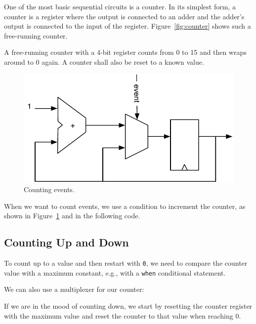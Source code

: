 \documentclass[%
    10pt,
    headinclude, footexclude,
    openright, %
    notitlepage,
    cleardoubleempty,
    headsepline,
    pointlessnumbers,
    bibtotoc, idxtotoc,
    ]{scrbook}
\newcommand{\code}[1]{{\small{\texttt{#1}}}}
\newcommand{\scale}{0.7}
\begin{document}
One of the most basic sequential circuits is a counter. In its simplest form, a counter is a register
where the output is connected to an adder and the adder's output is connected to the input
of the register. Figure~\ref{fig:counter} shows such a free-running counter.

A free-running counter with a 4-bit register counts from 0 to 15 and then wraps around
to 0 again. A counter shall also be reset to a known value.


\begin{figure}
  \centering
  \includegraphics[scale=\scale]{figures/event-counter}
  \caption{Counting events.}
  \label{fig:event-counter}
\end{figure}

\noindent When we want to count events, we use a condition to increment the counter,
as shown in Figure~\ref{fig:event-counter} and in the following code.


\subsection{Counting Up and Down}

To count up to a value and then restart with \code{0}, we need to compare
the counter value with a maximum constant, e.g., with a \code{when}
conditional statement.


\noindent We can also use a multiplexer for our counter:


\noindent If we are in the mood of counting down, we start by resetting the counter register
with the maximum value and reset the counter to that value when reaching 0.
\end{document}
